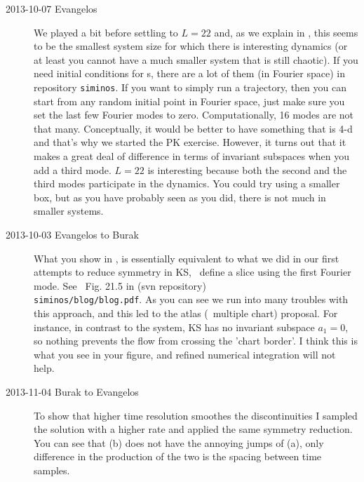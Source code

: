 \begin{description}
\item[2013-10-07 Evangelos] We played a bit before settling to $L=22$ and,
as we explain in , this seems to be the smallest
system size for which there is interesting dynamics (or at least you cannot
have a much smaller system that is still chaotic). If you need initial
conditions for \rpo s, there are a lot of them (in Fourier space) in repository
\texttt{siminos}. If you want to simply run a trajectory, then you can start
from any random initial point in Fourier space, just make sure you set
the last few Fourier modes to zero. Computationally, 16 modes are not that many.
Conceptually, it would be better to have something that is 4-d and that's
why we started the PK exercise. However, it turns out that it makes
a great deal of difference in terms of invariant subspaces
when you add a third mode. $L=22$ is interesting because both the second
and the third modes participate in the dynamics. You could try using a smaller
box, but as you have probably seen as you did, there is not much in smaller
systems.


\item[2013-10-03 Evangelos to Burak]
What you show in , is essentially
equivalent to what we did in our first attempts to reduce symmetry in KS, \ie\
define a slice using the first Fourier mode. See \eg\ Fig. 21.5 in
(svn repository)
\\
\texttt{siminos/blog/blog.pdf}. As you can see we run into
many troubles with this approach, and this led to the atlas (\ie\ multiple chart)
proposal. For instance, in contrast to the {\twoMode} system, KS has no invariant
subspace $a_1=0$, so nothing prevents the flow from crossing the 'chart border'.
I think this is what you see in your figure, and refined numerical integration
will not help.

\item[2013-11-04 Burak to Evangelos] To show that higher time resolution
smoothes the discontinuities I sampled the solution with a higher rate and
applied the same symmetry reduction.  You can see that (b)
does not have the annoying jumps of \reffig{fig:BBKSmovframes}(a), only difference
in the production of the two is the spacing between time samples.


\end{description}
